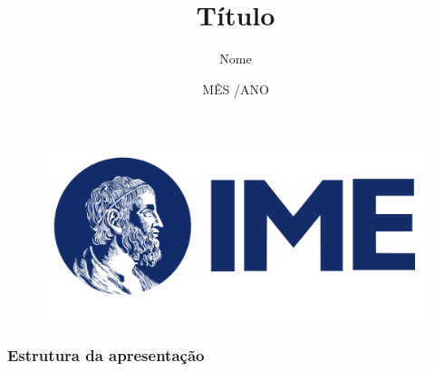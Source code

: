 \documentclass[
	11pt, %
]{beamer}
\title[Título completo]{Título}
\author{Nome}
\institute[IME-USP]{Instituto de Matemática e Estatística \\ (IME-USP)}
\date[Ano]{MÊS /ANO}
\begin{document}

\begin{frame}

        \begin{figure}
		\includegraphics[width=0.45\linewidth]{img/logo_IME.png}
	\end{figure}
 
	\titlepage %
\end{frame}



\begin{frame}
	\frametitle{Estrutura da apresentação} %
	
	\tableofcontents %
\end{frame}

\end{document}
